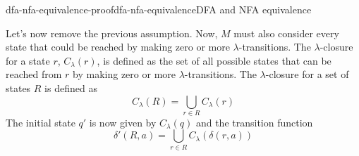 \documentclass[preview]{standalone}
\newcommand{\emptyString}{\lambda}
\begin{document}
\begin{snippetproof}{dfa-nfa-equivalence-proof}{dfa-nfa-equivalence}{DFA and NFA equivalence}
\begin{enumerate}
        Let's now remove the previous assumption. Now, \(M\)
        must also consider every state that could be reached by
        making zero or more \(\emptyString\)-transitions.
        The \(\emptyString\)-closure
        for a state \(r\), \(C_\emptyString(r)\), is defined as
        the set of all possible states that can be reached from \(r\) by making
        zero or more \(\emptyString\)-transitions.
        The \(\emptyString\)-closure for a set of states \(R\) is defined as
        \[
            C_\emptyString(R) = \bigcup_{r\in R}C_\emptyString(r)
        \]
        The initial state \(q'\) is now given by \(C_\emptyString(q)\)
        and the transition function
        \[
            \delta'(R, a) = \bigcup_{r\in R}C_\emptyString(\delta(r, a))
        \]
    \end{enumerate}
\end{snippetproof}

\end{document}
